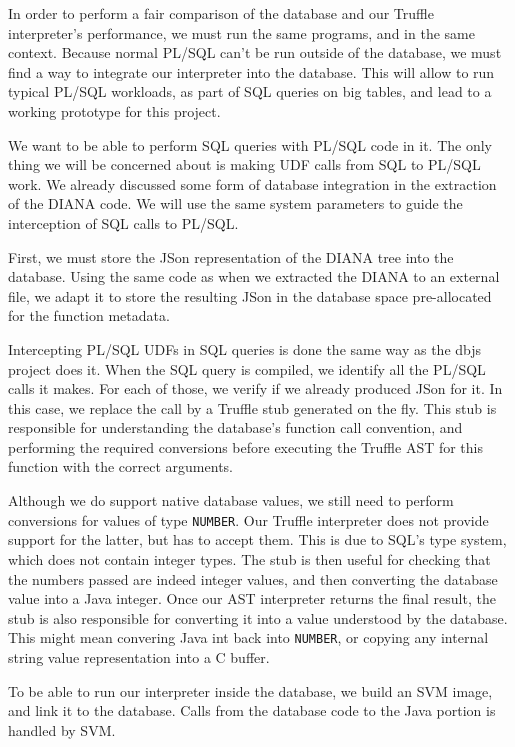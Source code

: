 \documentclass[twoside,11pt,a4paper]{article}
\newcommand{\java}[1]{\textsf{#1}}
\newcommand{\pls}[1]{\small\texttt{#1}\normalsize}
\newcommand{\plstype}[1]{\pls{#1}}
\newcommand{\oranum}{\plstype{NUMBER}}
\begin{document}
In order to perform a fair comparison of the database and our Truffle interpreter's performance, we must run the same programs, and in the same context. Because normal PL/SQL can't be run outside of the database, we must find a way to integrate our interpreter into the database. This will allow to run typical PL/SQL workloads, as part of SQL queries on big tables, and lead to a working prototype for this project.

We want to be able to perform SQL queries with PL/SQL code in it. The only thing we will be concerned about is making UDF calls from SQL to PL/SQL work. We already discussed some form of database integration in the extraction of the DIANA code. We will use the same system parameters to guide the interception of SQL calls to PL/SQL.

First, we must store the JSon representation of the DIANA tree into the database. Using the same code as when we extracted the DIANA to an external file, we adapt it to store the resulting JSon in the database space pre-allocated for the function metadata.

Intercepting PL/SQL UDFs in SQL queries is done the same way as the dbjs project does it. When the SQL query is compiled, we identify all the PL/SQL calls it makes. For each of those, we verify if we already produced JSon for it. In this case, we replace the call by a Truffle stub generated on the fly. This stub is responsible for understanding the database's function call convention, and performing the required conversions before executing the Truffle AST for this function with the correct arguments.

Although we do support native database values, we still need to perform conversions for values of type \oranum{}. Our Truffle interpreter does not provide support for the latter, but has to accept them. This is due to SQL's type system, which does not contain integer types. The stub is then useful for checking that the numbers passed are indeed integer values, and then converting the database value into a Java integer. Once our AST interpreter returns the final result, the stub is also responsible for converting it into a value understood by the database. This might mean convering Java \java{int} back into \oranum{}, or copying any internal string value representation into a C buffer.

To be able to run our interpreter inside the database, we build an SVM image, and link it to the database. Calls from the database code to the Java portion is handled by SVM.
\end{document}
